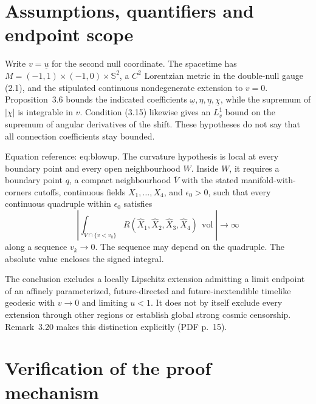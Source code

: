 \documentclass[10pt]{article}
\begin{document}
\section*{Assumptions, quantifiers and endpoint scope}
Write \(v=\underline u\) for the second null coordinate. The spacetime has \(M=(-1,1)\times(-1,0)\times\mathbb S^2\), a \(C^2\) Lorentzian metric in the double-null gauge (2.1), and the stipulated continuous nondegenerate extension to \(v=0\). Proposition 3.6 bounds the indicated coefficients \(\underline\omega,\eta,\underline\eta,\underline\chi\), while the supremum of \(|\chi|\) is integrable in \(v\). Condition (3.15) likewise gives an \(L^1_v\) bound on the supremum of angular derivatives of the shift. These hypotheses do not say that all connection coefficients stay bounded.\par
Equation reference: eq:blowup. The curvature hypothesis is local at every boundary point and every open neighbourhood \(W\). Inside \(W\), it requires a boundary point \(q\), a compact neighbourhood \(\overline V\) with the stated manifold-with-corners cutoffs, continuous fields \(X_1,\ldots,X_4\), and \(\epsilon_0>0\), such that every continuous quadruple within \(\epsilon_0\) satisfies \[
 \left|\int_{\overline V\cap\{v<v_k\}}
 R(\widehat X_1,\widehat X_2,\widehat X_3,\widehat X_4)\,\operatorname{vol}\right|
 \longrightarrow\infty\] along a sequence \(v_k\to0\). The sequence may depend on the quadruple. The absolute value encloses the signed integral.\par
The conclusion excludes a locally Lipschitz extension admitting a limit endpoint of an affinely parameterized, future-directed and future-inextendible timelike geodesic with \(v\to0\) and limiting \(u<1\). It does not by itself exclude every extension through other regions or establish global strong cosmic censorship. Remark 3.20 makes this distinction explicitly (PDF p. 15).\par
\section*{Verification of the proof mechanism}
\end{document}
